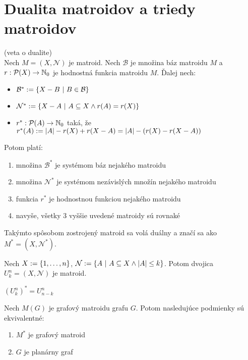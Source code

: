\section{Dualita matroidov a triedy matroidov}

\begin{theorem}{(veta o dualite)}\\
Nech $M = (X, \mathcal{N})$ je matroid. Nech $\mathcal{B}$ je množina báz matroidu $M$ a $r:\mathcal{P}(X) \to \mathbb{N}_0$ je hodnostná funkcia matroidu $M$.
Ďalej nech:
\begin{itemize}
    \item $\mathcal{B}^* := \left\{X - B ~|~ B \in \mathcal{B}\right\}$
    \item $\mathcal{N}^* := \left\{X - A ~|~ A \subseteq X \wedge r(A) = r(X)\right\}$
    \item $r^*: \mathcal{P}(A) \to \mathbb{N}_0$ taká, že $r^*(A) := \left|A\right| - r(X) + r(X - A) = \left|A\right| - (r(X) - r(X-A))$
\end{itemize}

\noindent
Potom platí:
\begin{enumerate}
    \item množina $\mathcal{B}^*$ je systémom báz nejakého matroidu
    \item množina $\mathcal{N}^*$ je systémom nezávislých množín nejakého matroidu
    \item funkcia $r^*$ je hodnostnou funkciou nejakého matroidu
    \item navyše, všetky 3 vyššie uvedené matroidy sú rovnaké
\end{enumerate}

\noindent
Takýmto spôsobom zostrojený matroid sa volá duálny a značí sa ako $M^* = (X, \mathcal{N}^*)$.

\end{theorem}

\begin{definition}
Nech $X:=\left\{1, \ldots, n\right\}$, $\mathcal{N}:=\left\{A ~|~ A \subseteq X \wedge \left|A\right| \leq k\right\}$. Potom 
dvojica $U_k^n = (X, \mathcal{N})$ je matroid.
\end{definition}

\begin{theorem}
$(U_k^n)^* = U_{n-k}^n$
\end{theorem}

\begin{theorem}
Nech $M(G)$ je grafový matroidu grafu $G$. Potom nasledujúce podmienky sú ekvivalentné:
\begin{enumerate}
    \item $M^*$ je grafový matroid
    \item $G$ je planárny graf
\end{enumerate}
\end{theorem}

